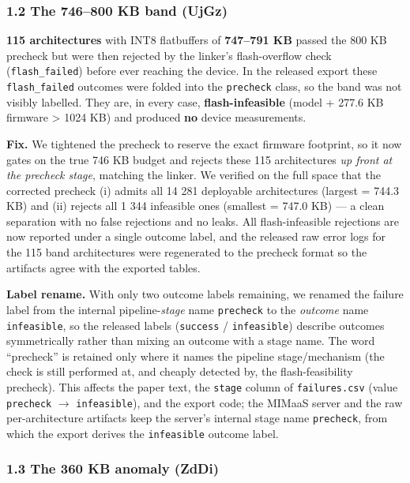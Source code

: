 \documentclass[11pt]{article}
\begin{document}
\subsubsection*{1.2 The 746--800 KB band (UjGz)}

\textbf{115 architectures} with INT8 flatbuffers of \textbf{747--791 KB} passed the 800 KB precheck but were then rejected by the linker's flash-overflow check (\texttt{flash\_\allowbreak{}failed}) before ever reaching the device. In the released export these \texttt{flash\_\allowbreak{}failed} outcomes were folded into the \texttt{precheck} class, so the band was not visibly labelled. They are, in every case, \textbf{flash-infeasible} (model + 277.6 KB firmware > 1024 KB) and produced \textbf{no} device measurements.


\textbf{Fix.} We tightened the precheck to reserve the exact firmware footprint, so it now gates on the true 746 KB budget and rejects these 115 architectures \textit{up front at the precheck stage}, matching the linker. We verified on the full space that the corrected precheck (i) admits all 14 281 deployable architectures (largest = 744.3 KB) and (ii) rejects all 1 344 infeasible ones (smallest = 747.0 KB) --- a clean separation with no false rejections and no leaks. All flash-infeasible rejections are now reported under a single outcome label, and the released raw error logs for the 115 band architectures were regenerated to the precheck format so the artifacts agree with the exported tables.


\textbf{Label rename.} With only two outcome labels remaining, we renamed the failure label from the internal pipeline-\textit{stage} name \texttt{precheck} to the \textit{outcome} name \texttt{infeasible}, so the released labels (\texttt{success} / \texttt{infeasible}) describe outcomes symmetrically rather than mixing an outcome with a stage name. The word ``precheck'' is retained only where it names the pipeline stage/mechanism (the check is still performed at, and cheaply detected by, the flash-feasibility precheck). This affects the paper text, the \texttt{stage} column of \texttt{failures.csv} (value \texttt{precheck} $\to$ \texttt{infeasible}), and the export code; the MIMaaS server and the raw per-architecture artifacts keep the server's internal stage name \texttt{precheck}, from which the export derives the \texttt{infeasible} outcome label.


\subsubsection*{1.3 The 360 KB anomaly (ZdDi)}
\end{document}
